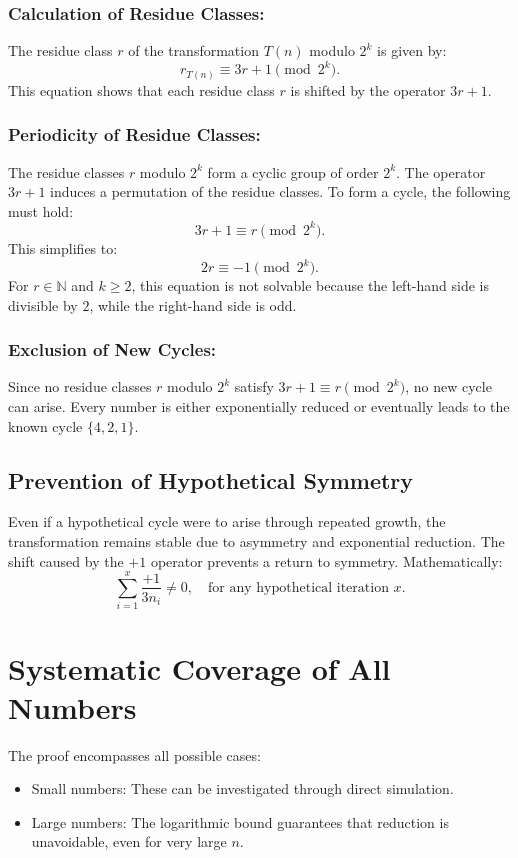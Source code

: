 \documentclass[a4paper,12pt]{article}
\begin{document}
\subsubsection{Calculation of Residue Classes:}
   The residue class \( r \) of the transformation \( T(n) \) modulo \( 2^k \) is given by:
   \[
   r_{T(n)} \equiv 3r + 1 \pmod{2^k}.
   \]
   This equation shows that each residue class \( r \) is shifted by the operator \( 3r + 1 \).

\subsubsection{Periodicity of Residue Classes:}
   The residue classes \( r \) modulo \( 2^k \) form a cyclic group of order \( 2^k \). The operator \( 3r + 1 \) induces a permutation of the residue classes. To form a cycle, the following must hold:
   \[
   3r + 1 \equiv r \pmod{2^k}.
   \]
   This simplifies to:
   \[
   2r \equiv -1 \pmod{2^k}.
   \]
   For \( r \in \mathbb{N} \) and \( k \geq 2 \), this equation is not solvable because the left-hand side is divisible by \( 2 \), while the right-hand side is odd.

\subsubsection{Exclusion of New Cycles:}
   Since no residue classes \( r \) modulo \( 2^k \) satisfy \( 3r + 1 \equiv r \pmod{2^k} \), no new cycle can arise. Every number is either exponentially reduced or eventually leads to the known cycle \( \{4, 2, 1\} \).

\subsection{Prevention of Hypothetical Symmetry}
Even if a hypothetical cycle were to arise through repeated growth, the transformation remains stable due to asymmetry and exponential reduction. The shift caused by the \(+1\) operator prevents a return to symmetry. Mathematically:
\[
\sum_{i=1}^x \frac{+1}{3n_i} \neq 0, \quad \text{for any hypothetical iteration } x.
\]

\section{Systematic Coverage of All Numbers}
The proof encompasses all possible cases:
\begin{itemize}
    \item Small numbers: These can be investigated through direct simulation.
    \item Large numbers: The logarithmic bound guarantees that reduction is unavoidable, even for very large \( n \).
\end{itemize}
\end{document}
